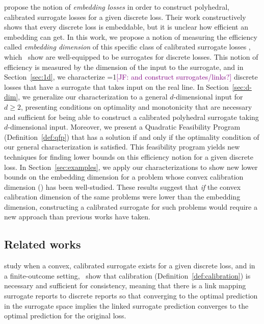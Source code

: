 \documentclass[anon]{colt2020} %
\newcommand{\Comments}{1}
\newcommand{\mynote}[2]{\ifnum\Comments=1\textcolor{#1}{#2}\fi}
\newcommand{\jessie}[1]{\mynote{purple}{[JF: #1]}}
\begin{document}
\cite{finocchiaro2019embedding} propose the notion of \emph{embedding losses} in order to construct polyhedral, calibrated surrogate losses for a given discrete loss.
Their work constructively shows that every discrete loss is embeddable, but it is unclear how efficient an embedding can get.
In this work, we propose a notion of measuring the efficiency called \emph{embedding dimension} of this specific class of calibrated surrogate losses , which~\cite{finocchiaro2019embedding} show are well-equipped to be surrogates for discrete losses.
This notion of efficiency is measured by the dimension of the input to the surrogate, and in Section~\ref{sec:1d}, we characterize \jessie{and construct surrogates/links?} discrete losses that have a surrogate that takes input on the real line.
In Section~\ref{sec:d-dim}, we generalize our characterization to a general $d$-dimensional input for $d \geq 2$, presenting conditions on optimality and monotonicity that are necessary and sufficient for being able to construct a calibrated polyhedral surrogate taking $d$-dimensional input.
Moreover, we present a Quadratic Feasibility Program (Definition~\ref{def:qfp}) that has a solution if and only if the optimality condition of our general characterization is satisfied.
This feasibility program yields new techniques for finding lower bounds on this efficiency notion for a given discrete loss.
In Section~\ref{sec:examples}, we apply our characterizations to show new lower bounds on the embedding dimension for a problem whose convex calibration dimension (\cite{ramaswamy2016convex, ramaswamy2018consistent}) has been well-studied.
These results suggest that \emph{if} the convex calibration dimension of the same problems were lower than the embedding dimension, constructing a calibrated surrogate for such problems would require a new approach than previous works have taken.


\subsection{Related works}
\cite{bartlett2006convexity} study when a convex, calibrated surrogate exists for a given discrete loss, and in a finite-outcome setting,~\cite{tewari2007consistency} show that calibration (Definition~\ref{def:calibration}) is necessary and sufficient for consistency, meaning that there is a link mapping surrogate reports to discrete reports so that converging to the optimal prediction in the surrogate space implies the linked surrogate prediction converges to the optimal prediction for the original loss.
\end{document}

